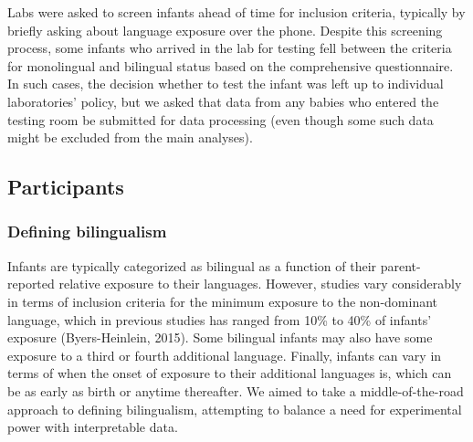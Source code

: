 \documentclass[
  english,
  ,man,floatsintext]{apa6}
\begin{document}
Labs were asked to screen infants ahead of time for inclusion criteria, typically by briefly asking about language exposure over the phone. Despite this screening process, some infants who arrived in the lab for testing fell between the criteria for monolingual and bilingual status based on the comprehensive questionnaire. In such cases, the decision whether to test the infant was left up to individual laboratories' policy, but we asked that data from any babies who entered the testing room be submitted for data processing (even though some such data might be excluded from the main analyses).

\hypertarget{participants}{%
\subsection{Participants}\label{participants}}

\hypertarget{defining-bilingualism}{%
\subsubsection{Defining bilingualism}\label{defining-bilingualism}}

Infants are typically categorized as bilingual as a function of their parent-reported relative exposure to their languages. However, studies vary considerably in terms of inclusion criteria for the minimum exposure to the non-dominant language, which in previous studies has ranged from 10\% to 40\% of infants' exposure (Byers-Heinlein, 2015). Some bilingual infants may also have some exposure to a third or fourth additional language. Finally, infants can vary in terms of when the onset of exposure to their additional languages is, which can be as early as birth or anytime thereafter. We aimed to take a middle-of-the-road approach to defining bilingualism, attempting to balance a need for experimental power with interpretable data.
\end{document}
